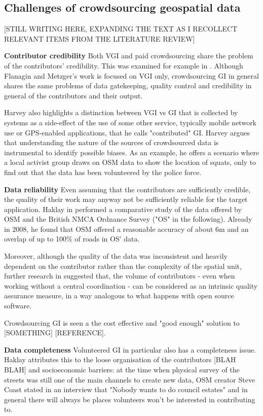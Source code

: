  \subsection{Challenges of crowdsourcing geospatial data}

[STILL WRITING HERE, EXPANDING THE TEXT AS I RECOLLECT RELEVANT ITEMS FROM THE LITERATURE REVIEW]

\textbf{Contributor credibility} Both VGI and paid crowdsourcing share the problem of the contributors' credibility. This was examined for example in \cite{Flanagin:2008ck}. Although Flanagin and Metzger's work is focused on VGI only, crowdsourcing GI in general shares the same problems of data gatekeeping, quality control and credibility in general of the contributors and their output. 

Harvey \cite{Harvey:2012ws} also highlights a distinction between VGI vs GI that is collected by systems as a side-effect of the use of some other service, typically mobile network use or GPS-enabled applications, that he calls "contributed" GI. Harvey argues that understanding the nature of the sources of crowdsourced data is instrumental to identify possible biases. As an example, he offers a scenario where a local activist group draws on OSM data to show the location of squats, only to find out that the data has been volunteered by the police force. 

\textbf{Data reliability} Even assuming that the contributors are sufficiently credible, the quality of their work may anyway not be sufficiently reliable for the target application. Haklay in \cite{Haklay:2010vs} performed a comparative study of the data offered by OSM and the British NMCA Ordnance Survey ("OS" in the following). Already in 2008, he found that OSM offered a reasonable accuracy of about 6m and an overlap of up to 100\% of roads in OS' data. 

Moreover, although the quality of the data was inconsistent and heavily dependent on the contributor rather than the complexity of the spatial unit, further research in  \cite{Haklay:2010wf} suggested that, the volume of contributors - even when working without a central coordination - can be considered as an intrinsic quality assurance measure, in a way analogous to what happens with open source software.

Crowdsourcing GI is seen a the cost effective and "good enough" solution to [SOMETHING] [REFERENCE]. 

\textbf{Data completeness} Volunteered GI in particular also has a completeness issue. Haklay attributes this to the loose organisation of the contributors \cite{Haklay:2010vs} [BLAH BLAH] and socioeconomic barriers: at the time when physical survey of the streets was still one of the main channels to create new data, OSM creator Steve Coast stated in an interview that "Nobody wants to do council estates" \cite{Anonymous:2007ux} and in general there will always be places volunteers won't be interested in contributing to.

